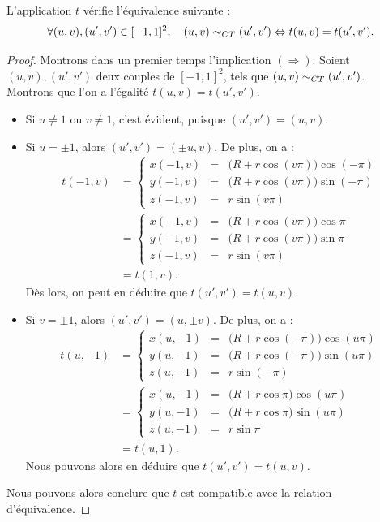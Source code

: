 \documentclass[hidelinks, 10pt]{article}
\begin{document}
\begin{proposition}\label{prop:torus-relation}
L'application $t$ vérifie l'équivalence suivante : \begin{equation*}
\forall(u,v),(u',v')\in[-1,1]^2,\quad (u,v)\sim_{CT}(u',v')\Leftrightarrow t(u,v)=t(u',v').
\end{equation*}
\end{proposition}
\begin{proof}
Montrons dans un premier temps l'implication $(\Rightarrow)$. Soient $(u,v),(u',v')$ deux couples de $[-1,1]^2$, tels que $(u,v)\sim_{CT}(u',v')$. Montrons que l'on a l'égalité $t(u,v)=t(u',v')$.\begin{itemize}
    \item Si $u\neq 1$ ou $v\neq 1$, c'est évident, puisque $(u',v')=(u,v)$.
    \item Si $u=\pm1$, alors $(u',v')=(\pm u,v)$. De plus, on a : \[\begin{split}
t(-1,v)&=\left\{\begin{matrix}
x(-1,v)&=&\big(R+r\cos (v\pi)\big)\cos(-\pi)\\ 
y(-1,v)&=&\big(R+r\cos (v\pi)\big)\sin(-\pi)\\ 
z(-1,v)&=&r\sin (v\pi)
\end{matrix}\right.\\
&=\left\{\begin{matrix}
x(-1,v)&=&\big(R+r\cos (v\pi)\big)\cos \pi\\ 
y(-1,v)&=&\big(R+r\cos (v\pi)\big)\sin \pi\\ 
z(-1,v)&=&r\sin (v\pi)
\end{matrix}\right.\\
&=t(1,v).
\end{split}\]Dès lors, on peut en déduire que $t(u',v')=t( u,v)$.
\item Si $v=\pm1$, alors $(u',v')=(u,\pm v)$. De plus, on a : \[\begin{split}
t(u,-1)&=\left\{\begin{matrix}
x(u,-1)&=&\big(R+r\cos (-\pi)\big)\cos(u\pi)\\ 
y(u,-1)&=&\big(R+r\cos (-\pi)\big)\sin(u\pi)\\ 
z(u,-1)&=&r\sin (-\pi)
\end{matrix}\right.\\
&=\left\{\begin{matrix}
x(u,-1)&=&\big(R+r\cos \pi\big)\cos (u\pi)\\ 
y(u,-1)&=&\big(R+r\cos \pi\big)\sin (u\pi)\\ 
z(u,-1)&=&r\sin \pi
\end{matrix}\right.\\
&=t(u,1).
\end{split}\]Nous pouvons alors en déduire que $t(u',v')=t(u,v)$.
\end{itemize}
Nous pouvons alors conclure que $t$ est compatible avec la relation d'équivalence.


\end{proof}
\end{document}
